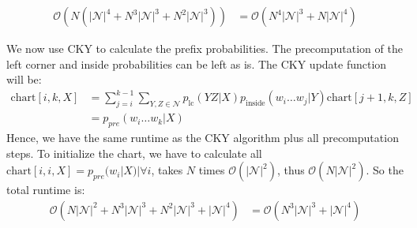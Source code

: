 \documentclass[a4paper,12pt]{ETHexercise}
\begin{document}
\begin{question}
\begin{subquestion}
		\begin{align}
			\mathcal{O}(N (|\mathcal{N}|^4 + N^3 |\mathcal{N}|^3 + N^2 |\mathcal{N}|^3)) & = \mathcal{O}(N^4 |\mathcal{N}|^3 + N |\mathcal{N}|^4)
		\end{align}
	\end{subquestion}
	\begin{subquestion}
		We now use CKY to calculate the prefix probabilities. The precomputation of the left corner and inside probabilities can be left as is. The CKY update function will be:
		\begin{align}
			\text{chart}[i,k,X] & = \sum_{j=i}^{k-1} \sum_{Y,Z \in \mathcal{N}} p_{\text{lc}}(YZ | X) p_{\text{inside}}(w_i \dots w_j | Y) \text{chart}[j+1, k, Z] \label{eq:cky} \\
			                    & = p_{pre}(w_i \dots w_k | X)
		\end{align}
		Hence, we have the same runtime as the CKY algorithm plus all precomputation steps. To initialize the chart, we have to calculate all $\text{chart}[i,i,X] = p_{pre}(w_i | X) | \forall i$, takes $N$ times $\mathcal{O}(|\mathcal{N}|^2)$, thus $\mathcal{O}(N |\mathcal{N}|^2)$. So the total runtime is:
		\begin{align}
			\mathcal{O}(N |\mathcal{N}|^2 + N^3 |\mathcal{N}|^3 + N^2 |\mathcal{N}|^3 + |\mathcal{N}|^4) & = \mathcal{O}(N^3 |\mathcal{N}|^3 + |\mathcal{N}|^4)
		\end{align}
	\end{subquestion}
\end{question}
\end{document}
